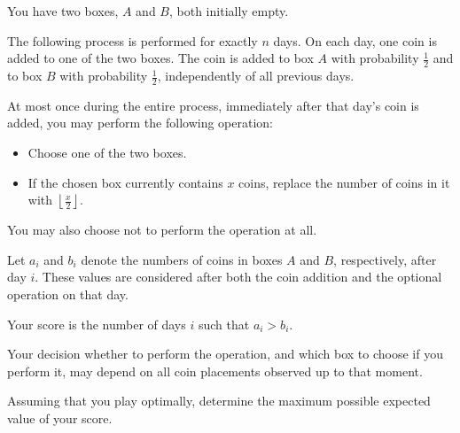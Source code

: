 You have two boxes, $A$ and $B$, both initially empty.

The following process is performed for exactly $n$ days. On each day, one coin is added to one of the two boxes. The coin is added to box $A$ with probability $\frac{1}{2}$ and to box $B$ with probability $\frac{1}{2}$, independently of all previous days.

At most once during the entire process, immediately after that day's coin is added, you may perform the following operation:

\begin{itemize}
\item Choose one of the two boxes.
\item If the chosen box currently contains $x$ coins, replace the number of coins in it with $\left\lfloor \frac{x}{2} \right\rfloor$.
\end{itemize}

You may also choose not to perform the operation at all.

Let $a_i$ and $b_i$ denote the numbers of coins in boxes $A$ and $B$, respectively, after day $i$. These values are considered after both the coin addition and the optional operation on that day.

Your score is the number of days $i$ such that $a_i > b_i$.

Your decision whether to perform the operation, and which box to choose if you perform it, may depend on all coin placements observed up to that moment.

Assuming that you play optimally, determine the maximum possible expected value of your score.